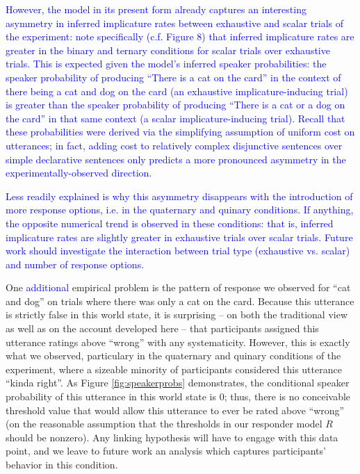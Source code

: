 \documentclass[man]{apa6}
\newcommand{\change}[1]{\textcolor{Blue}{#1}}
\theoremstyle{definition}
\theoremstyle{definition}
\theoremstyle{definition}
\theoremstyle{remark}
\begin{document}
\change{However, the model in its present form already captures an interesting asymmetry in inferred implicature rates between exhaustive and scalar trials of the experiment: note specifically (c.f. Figure 8) that inferred implicature rates are greater in the binary and ternary conditions for scalar trials over exhaustive trials. This is expected given the model’s inferred speaker probabilities: the speaker probability of producing “There is a cat on the card” in the context of there being a cat and dog on the card (an exhaustive implicature-inducing trial) is greater than the speaker probability of producing “There is a cat or a dog on the card” in that same context (a scalar implicature-inducing trial). Recall that these probabilities were derived via the simplifying assumption of uniform cost on utterances; in fact, adding cost to relatively complex disjunctive sentences over simple declarative sentences only predicts a more pronounced asymmetry in the experimentally-observed direction.}

\change{Less readily explained is why this asymmetry disappears with the introduction of more response options, i.e. in the quaternary and quinary conditions. If anything, the opposite numerical trend is observed in these conditions: that is, inferred implicature rates are slightly greater in exhaustive trials over scalar trials. Future work should investigate the interaction between trial type (exhaustive vs. scalar) and number of response options.}

One \change{additional} empirical problem is the pattern of response we observed
for \enquote{cat and dog} on trials where there was only a cat on the
card. Because this utterance is strictly false in this world state, it
is surprising -- on both the traditional view as well as on the account
developed here -- that participants assigned this utterance ratings
above \enquote{wrong} with any systematicity. However, this is exactly
what we observed, particulary in the quaternary and quinary conditions
of the experiment, where a sizeable minority of participants considered
this utterance \enquote{kinda right}. As Figure \ref{fig:speakerprobs}
demonstrates, the conditional speaker probability of this utterance in
this world state is 0; thus, there is no conceivable threshold value
that would allow this utterance to ever be rated above \enquote{wrong}
(on the reasonable assumption that the thresholds in our responder model
\(R\) should be nonzero). Any linking hypothesis will have to engage
with this data point, and we leave to future work an analysis which
captures participants' behavior in this condition.
\end{document}
